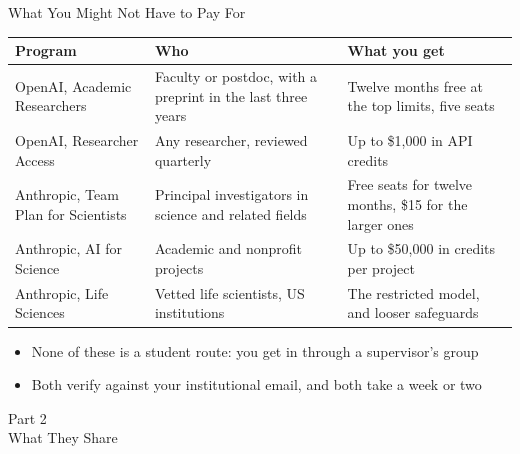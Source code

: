 \documentclass[aspectratio=169]{beamer}
\begin{document}
\begin{frame}{What You Might Not Have to Pay For}
    \begin{center}
    \scriptsize
    \begin{tabular}{p{3.5cm}>{\raggedright\arraybackslash}p{4.2cm}>{\raggedright\arraybackslash}p{4.3cm}}
        \toprule
        Program & Who & What you get \\
        \midrule
        OpenAI, Academic Researchers & Faculty or postdoc, with a preprint in the last three years & Twelve months free at the top limits, five seats \\
        OpenAI, Researcher Access    & Any researcher, reviewed quarterly & Up to \$1,000 in API credits \\
        Anthropic, Team Plan for Scientists & Principal investigators in science and related fields & Free seats for twelve months, \$15 for the larger ones \\
        Anthropic, AI for Science    & Academic and nonprofit projects & Up to \$50,000 in credits per project \\
        Anthropic, Life Sciences     & Vetted life scientists, US institutions & The restricted model, and looser safeguards \\
        \bottomrule
    \end{tabular}
    \end{center}

    \vspace{0.8em}
    \begin{itemize}
        \item None of these is a student route: you get in through a supervisor's group
        \item Both verify against your institutional email, and both take a week or two
    \end{itemize}
\end{frame}

\begin{frame}[plain]
    \vfill
    \begin{center}
        {\Huge Part 2}\\[0.8em]
        {\Large What They Share}
    \end{center}
    \vfill
\end{frame}
\end{document}
